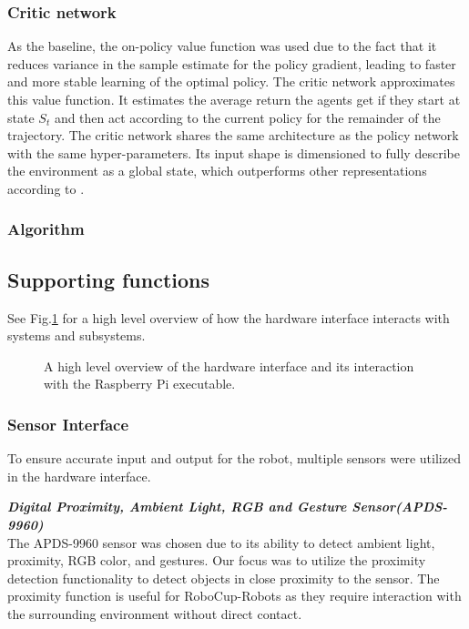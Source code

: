 \subsubsection{Critic network}
As the baseline, the on-policy value function was used due to the fact that it reduces variance in the sample estimate for the policy gradient, leading to faster and more stable learning of the optimal policy. The critic network approximates this value function. It estimates the average return the agents get if they start at state $S_t$ and then act according to the current policy for the remainder of the trajectory. The critic network shares the same architecture as the policy network with the same hyper-parameters. Its input shape is dimensioned to fully describe the environment as a global state, which outperforms other representations according to \cite{yu_surprising_2022}.

\subsubsection{Algorithm}



\subsection{Supporting functions}

See Fig.\:\ref{fig:hardware_interface_graph} for a high level overview of how the hardware interface interacts with systems and subsystems.
\begin{figure}
	\centering
	
	\caption{A high level overview of the hardware interface and its interaction with the Raspberry Pi executable.}
	\label{fig:hardware_interface_graph}
\end{figure}

\subsubsection{Sensor Interface}
To ensure accurate input and output for the robot, multiple sensors were utilized in the hardware interface.

\textbf{\textit{Digital Proximity, Ambient Light, RGB and Gesture Sensor(APDS-9960)}}\\
The APDS-9960 sensor was chosen due to its ability to detect ambient light, proximity, RGB color, and gestures. Our focus was to utilize the proximity detection functionality to detect objects in close proximity to the sensor. The proximity function is useful for RoboCup-Robots as they require interaction with the surrounding environment without direct contact.

